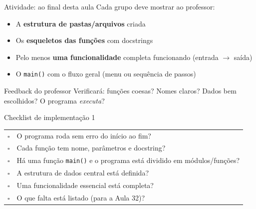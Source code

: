 \documentclass[aspectratio=169,10pt,t]{beamer}
\begin{document}
\begin{frame}{Atividade: ao final desta aula}
  Cada grupo deve mostrar ao professor:
  \begin{itemize}
    \item A \textbf{estrutura de pastas/arquivos} criada
    \item Os \textbf{esqueletos das funções} com docstrings
    \item Pelo menos \textbf{uma funcionalidade} completa funcionando (entrada \(\to\) saída)
    \item O \texttt{main()} com o fluxo geral (menu ou sequência de passos)
  \end{itemize}
  \begin{exampleblock}{Feedback do professor}
    Verificará: funções coesas? Nomes claros? Dados bem escolhidos? O programa \emph{executa}?
  \end{exampleblock}
\end{frame}

\begin{frame}{Checklist de implementação 1}
  \small
  \begin{tabular}{@{}cl@{}}
    $\square$ & O programa roda sem erro do início ao fim?\\
    $\square$ & Cada função tem nome, parâmetros e docstring?\\
    $\square$ & Há uma função \texttt{main()} e o programa está dividido em módulos/funções?\\
    $\square$ & A estrutura de dados central está definida?\\
    $\square$ & Uma funcionalidade essencial está completa?\\
    $\square$ & O que falta está listado (para a Aula 32)?\\
  \end{tabular}
\end{frame}
\end{document}

